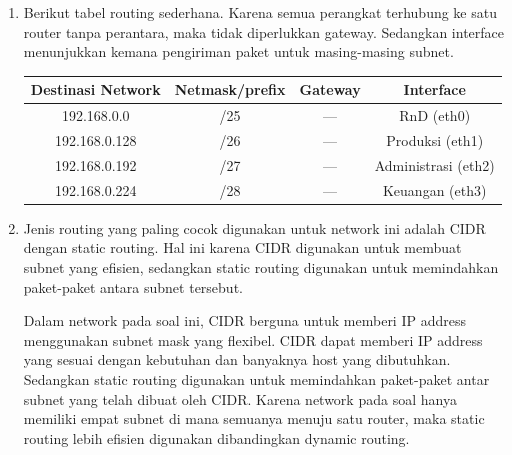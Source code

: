 \begin{enumerate}
\begin{center}
    \end{center}
	\item Berikut tabel routing sederhana. Karena semua perangkat 
	terhubung ke satu router tanpa perantara, maka tidak diperlukkan 
	gateway. Sedangkan interface menunjukkan kemana pengiriman 
	paket untuk masing-masing subnet.
	{\small
		\begin{center}
		\begin{tabular}{ |c|c|c|c| } 
			\hline
			Destinasi Network & Netmask/prefix & Gateway & Interface \\
			\hline
			192.168.0.0 & /25 & --- & RnD (eth0)  \\
			192.168.0.128 & /26 & --- & Produksi (eth1)  \\
			192.168.0.192 & /27 & --- & Administrasi (eth2)  \\
			192.168.0.224 & /28 & --- & Keuangan (eth3)  \\
			\hline
		\end{tabular}
		\end{center}
	}
	\item Jenis routing yang paling cocok digunakan untuk network 
	ini adalah CIDR dengan static routing. Hal ini karena CIDR 
	digunakan untuk membuat subnet yang efisien, sedangkan 
	static routing digunakan untuk memindahkan paket-paket antara 
	subnet tersebut.

	Dalam network pada soal ini, CIDR berguna untuk memberi IP 
	address menggunakan subnet mask yang flexibel. CIDR dapat 
	memberi IP address yang sesuai dengan kebutuhan dan  
	banyaknya host yang dibutuhkan. Sedangkan static routing 
	digunakan untuk memindahkan paket-paket antar subnet yang 
	telah dibuat oleh CIDR. Karena network pada soal hanya 
	memiliki empat subnet di mana semuanya menuju satu router, 
	maka static routing lebih efisien digunakan dibandingkan
	dynamic routing.
\end{enumerate}